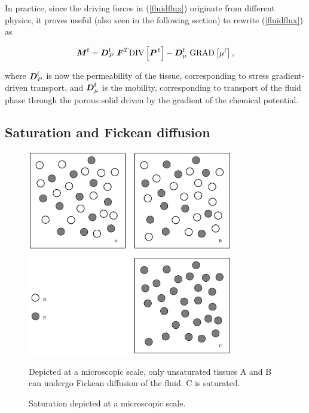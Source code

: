 In practice, since the driving forces in (\ref{fluidflux}) originate
from different physics, it proves useful (also seen in the following
section) to rewrite (\ref{fluidflux}) as

\begin{equation}
\bM^\mathrm{f} = \bD^\mathrm{f}_{P}\ \bF^T\mathrm{DIV}
\left[\bP^{\,\mathrm{f}}\right] -
\bD^\mathrm{f}_{\mu}\ \mathrm{GRAD}\left[\mu^\mathrm{f}\right],
\label{splitflux}
\end{equation}

\noindent where $\mbox{\boldmath$ D$}^\mathrm{f}_{P}$ is now the permeability of the
tissue, corresponding to stress gradient-driven transport, and
$\mbox{\boldmath$ D$}^\mathrm{f}_{\mu}$ is the mobility, corresponding to transport of
the fluid phase through the porous solid driven by the gradient of the
chemical potential.

\subsection{Saturation and Fickean diffusion}
\label{saturation-and-fickean-diffusion}

\begin{figure}
  \begin{center}
    \includegraphics[width=0.8\textwidth]{images/elucidation/saturation}
    \caption{Saturation depicted at a microscopic scale.}
    \label{fickean-diffusion}
  \end{center}
      {Depicted at a microscopic scale, only unsaturated tissues A and
        B can undergo Fickean diffusion of the fluid. C is saturated.}
\end{figure}

